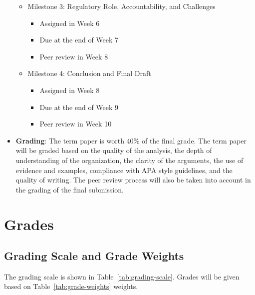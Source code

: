\documentclass[11pt, letterpaper]{article}
\begin{document}
\begin{itemize}
\begin{itemize}
            \item Milestone 3: Regulatory Role, Accountability, and Challenges
                \begin{itemize}
                    \item Assigned in Week 6
                    \item Due at the end of Week 7
                    \item Peer review in Week 8
                \end{itemize}
        
            \item Milestone 4: Conclusion and Final Draft
                \begin{itemize}
                    \item Assigned in Week 8
                    \item Due at the end of Week 9
                    \item Peer review in Week 10
                \end{itemize}
            \end{itemize}
    \item \textbf{Grading}: The term paper is worth 40\% of the final grade. The term paper will be graded based on the quality of the analysis, the depth of understanding of the organization, the clarity of the arguments, the use of evidence and examples, compliance with APA style guidelines, and the quality of writing. The peer review process will also be taken into account in the grading of the final submission.

\end{itemize}

\section{Grades}

\subsection*{Grading Scale and Grade Weights}  
The grading scale is shown in Table~\ref{tab:grading-scale}. Grades will be given based on Table~\ref{tab:grade-weights} weights.
\end{document}
